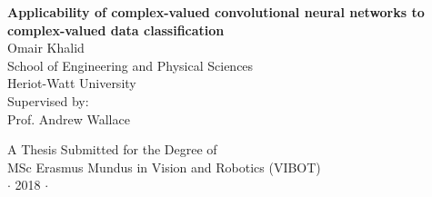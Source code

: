 
\newpage
\thispagestyle{empty}

\vspace*{2cm}
\begin{center}
{\Large\bf Applicability of complex-valued convolutional neural networks to complex-valued data classification\\} \vspace{2cm} {\large
Omair Khalid\\
\vspace{2cm}
School of Engineering and Physical Sciences \\
Heriot-Watt University\\
\vspace{2cm}
Supervised by: \\
\centering Prof. Andrew Wallace
}

\end{center}

\vspace{5cm}
\begin{center}
{\large A Thesis Submitted for the Degree of \\MSc Erasmus Mundus
in Vision and Robotics (VIBOT) \\\vspace{0.3cm} $\cdot$ 2018
$\cdot$}
\end{center}
\singlespacing


\begin{abstract}
Complex numbers are aptly used to describe natural phenomena: wind (speed and direction), electromagnetic waves, MRI data etc. However, CNNs are dominated by the use of real numbers. If we aim to better exploit the camplex-natured data in order to improve the classsification, the CNN should be able to process the complex data. In this work, we explore the design choices and challenges faced while working with $\mathbb{C}$-CNNs. We propose the architectures of and compare the performance of $\mathbb{C}$-CNN and $\mathbb{R}$-CNNs on a synthetic data set (MNIST+P) and two real world radar-datasets. The results are inconclusive to establish the relevance of $\mathbb{C}$-CNNs.

\vspace*{5cm}
\end{abstract}

